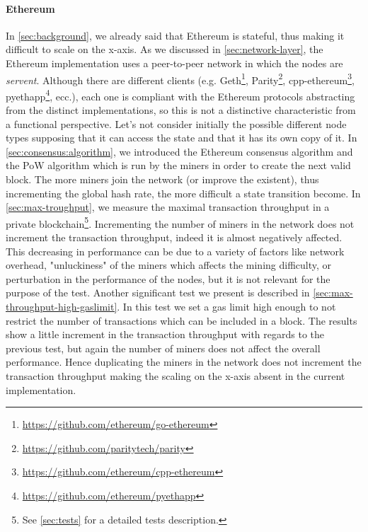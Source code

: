 \paragraph{Ethereum}
\label{sec:x-axis-ethereum}
In \autoref{sec:background}, we already said that Ethereum is stateful, thus
making it difficult to scale on the x-axis. As we discussed in
\autoref{sec:network-layer}, the Ethereum implementation uses a peer-to-peer
network in which the nodes are \emph{servent}. Although there are different
clients (e.g. Geth\footnote{\url{https://github.com/ethereum/go-ethereum}},
Parity\footnote{\url{https://github.com/paritytech/parity}},
cpp-ethereum\footnote{\url{https://github.com/ethereum/cpp-ethereum}},
pyethapp\footnote{\url{https://github.com/ethereum/pyethapp}}, ecc.), each one
is compliant with the Ethereum protocols abstracting from the distinct
implementations, so this is not a distinctive characteristic from a functional
perspective. Let's not consider initially the possible different node types
 supposing that it can access the state and that it has its
own copy of it. In \autoref{sec:consensus:algorithm}, we introduced the Ethereum
consensus algorithm and the PoW algorithm which is run by the miners in order to
create the next valid block. The more miners join the network (or improve the
existent), thus incrementing the global hash rate, the more difficult a state
transition become. In \autoref{sec:max-troughput}, we measure the maximal
transaction throughput in a private blockchain\footnote{See \autoref{sec:tests}
for a detailed tests description.}. Incrementing the number of miners in the
network does not increment the transaction throughput, indeed it is almost
negatively affected. This decreasing in performance can be due to a variety of
factors like network overhead, "unluckiness" of the miners which affects the
mining difficulty, or perturbation in the performance of the nodes, but it is
not relevant for the purpose of the test. Another significant test we present is
described in \autoref{sec:max-throughput-high-gaslimit}. In this test we set a
gas limit high enough to not restrict the number of transactions which can be
included in a block. The results show a little increment in the transaction
throughput with regards to the previous test, but again the number of miners
does not affect the overall performance. Hence duplicating the miners in the
network does not increment the transaction throughput making the scaling on the
x-axis absent in the current implementation.


